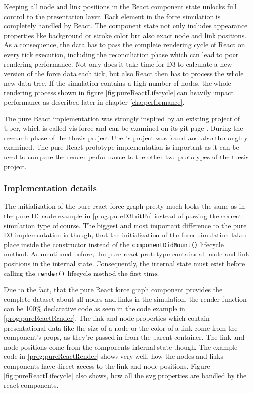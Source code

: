 Keeping all node and link positions in the React component state unlocks full control to the presentation layer. Each element in the force simulation is completely handled by React. The component state not only includes appearance properties like background or stroke color but also exact node and link positions. As a consequence, the data has to pass the complete rendering cycle of React on every tick execution, including the reconciliation phase which can lead to poor rendering performance. Not only does it take time for D3 to calculate a new version of the force data each tick, but also React then has to process the whole new data tree. If the simulation contains a high number of nodes, the whole rendering process shown in figure \ref{fig:pureReactLifecycle} can heavily impact performance as described later in chapter \ref{cha:performance}.

The pure React implementation was strongly inspired by an existing project of Uber, which is called vis-force and can be examined on its git page \cite{UberVisForce}. During the research phase of the thesis project Uber's project was found and also thoroughly examined. The pure React prototype implementation is important as it can be used to compare the render performance to the other two prototypes of the thesis project.

\subsubsection{Implementation details}

The initialization of the pure react force graph pretty much looks the same as in the pure D3 code example in \ref{prog:pureD3InitFn} instead of passing the correct simulation type of course. The biggest and most important difference to the pure D3 implementation is though, that the initialization of the force simulation takes place inside the constructor instead of the \texttt{componentDidMount()} lifecycle method. As mentioned before, the pure react prototype contains all node and link positions in the internal state. Consequently, the internal state must exist before calling the \texttt{render()} lifecycle method the first time.

Due to the fact, that the pure React force graph component provides the complete dataset about all nodes and links in the simulation, the render function can be 100\% declarative code as seen in the code example in \ref{prog:pureReactRender}. The link and node properties which contain presentational data like the size of a node or the color of a link come from the component's props, as they're passed in from the parent container. The link and node positions come from the components internal state though. The example code in \ref{prog:pureReactRender} shows very well, how the nodes and links components have direct access to the link and node positions. Figure \ref{fig:pureReactLifecycle} also shows, how all the svg properties are handled by the react components.

